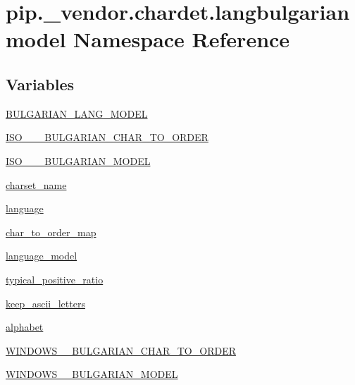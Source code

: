 \hypertarget{namespacepip_1_1__vendor_1_1chardet_1_1langbulgarianmodel}{}\section{pip.\+\_\+vendor.\+chardet.\+langbulgarianmodel Namespace Reference}
\label{namespacepip_1_1__vendor_1_1chardet_1_1langbulgarianmodel}
\subsection*{Variables}
\begin{DoxyCompactItemize}
\item 
\hyperlink{namespacepip_1_1__vendor_1_1chardet_1_1langbulgarianmodel_a83af5f43709e03f168153c93b0d72e82}{B\+U\+L\+G\+A\+R\+I\+A\+N\+\_\+\+L\+A\+N\+G\+\_\+\+M\+O\+D\+EL}
\item 
\hyperlink{namespacepip_1_1__vendor_1_1chardet_1_1langbulgarianmodel_ae9c399d02890d821fedef622499ebdf2}{I\+S\+O\+\_\+\_\+\_\+\+B\+U\+L\+G\+A\+R\+I\+A\+N\+\_\+\+C\+H\+A\+R\+\_\+\+T\+O\+\_\+\+O\+R\+D\+ER}
\item 
\hyperlink{namespacepip_1_1__vendor_1_1chardet_1_1langbulgarianmodel_a6f20af88dfd4b7354c3836337114d1cf}{I\+S\+O\+\_\+\_\+\_\+\+B\+U\+L\+G\+A\+R\+I\+A\+N\+\_\+\+M\+O\+D\+EL}
\item 
\hyperlink{namespacepip_1_1__vendor_1_1chardet_1_1langbulgarianmodel_a145e190fde2560f82942ba9a286620f0}{charset\+\_\+name}
\item 
\hyperlink{namespacepip_1_1__vendor_1_1chardet_1_1langbulgarianmodel_a411944aec0b9b611fb41d630ab8057e8}{language}
\item 
\hyperlink{namespacepip_1_1__vendor_1_1chardet_1_1langbulgarianmodel_a52b729a8c71c1ec4491538f8a4822df9}{char\+\_\+to\+\_\+order\+\_\+map}
\item 
\hyperlink{namespacepip_1_1__vendor_1_1chardet_1_1langbulgarianmodel_a423279c14e5da911a74694e4b1dd20aa}{language\+\_\+model}
\item 
\hyperlink{namespacepip_1_1__vendor_1_1chardet_1_1langbulgarianmodel_a5d20b5217ea8ea6f543d2638d21c3843}{typical\+\_\+positive\+\_\+ratio}
\item 
\hyperlink{namespacepip_1_1__vendor_1_1chardet_1_1langbulgarianmodel_ad43882f879ae0e1c4f4914830b1aff65}{keep\+\_\+ascii\+\_\+letters}
\item 
\hyperlink{namespacepip_1_1__vendor_1_1chardet_1_1langbulgarianmodel_ad26cb2540fe4fe70f8ac16f88e63fdf1}{alphabet}
\item 
\hyperlink{namespacepip_1_1__vendor_1_1chardet_1_1langbulgarianmodel_a54b6c78327bff321139c656cec1c85cb}{W\+I\+N\+D\+O\+W\+S\+\_\+\_\+\+B\+U\+L\+G\+A\+R\+I\+A\+N\+\_\+\+C\+H\+A\+R\+\_\+\+T\+O\+\_\+\+O\+R\+D\+ER}
\item 
\hyperlink{namespacepip_1_1__vendor_1_1chardet_1_1langbulgarianmodel_a0b4d9c3bc22acd5c9426dee1d237c6ad}{W\+I\+N\+D\+O\+W\+S\+\_\+\_\+\+B\+U\+L\+G\+A\+R\+I\+A\+N\+\_\+\+M\+O\+D\+EL}
\end{DoxyCompactItemize}


